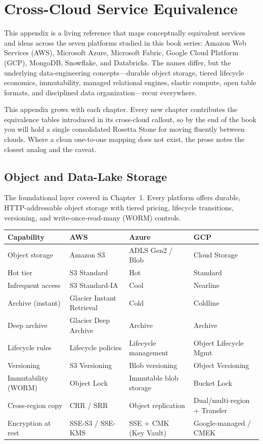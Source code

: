 \chapter{Cross-Cloud Service Equivalence}
%
This appendix is a living reference that maps conceptually equivalent services and
ideas across the seven platforms studied in this book series: Amazon Web Services
(AWS), Microsoft Azure, Microsoft Fabric, Google Cloud Platform (GCP), MongoDB,
Snowflake, and Databricks. The names differ, but the underlying data-engineering
concepts---durable object storage, tiered lifecycle economics, immutability, managed
relational engines, elastic compute, open table formats, and disciplined data
organization---recur everywhere.

\begin{notebox}
This appendix grows with each chapter. Every new chapter contributes the equivalence
tables introduced in its cross-cloud callout, so by the end of the book you will hold
a single consolidated Rosetta Stone for moving fluently between clouds. Where a clean
one-to-one mapping does not exist, the prose notes the closest analog and the caveat.
\end{notebox}

\section{Object and Data-Lake Storage}
%
The foundational layer covered in Chapter~1. Every platform offers durable, HTTP-addressable
object storage with tiered pricing, lifecycle transitions, versioning, and write-once-read-many
(WORM) controls.

\begin{center}
\footnotesize
\begin{tabular}{@{}p{2.8cm}p{3.2cm}p{3.2cm}p{3.2cm}@{}}
\toprule
\textbf{Capability} & \textbf{AWS} & \textbf{Azure} & \textbf{GCP} \\
\midrule
Object storage & Amazon S3 & ADLS Gen2 / Blob & Cloud Storage \\
Hot tier & S3 Standard & Hot & Standard \\
Infrequent access & S3 Standard-IA & Cool & Nearline \\
Archive (instant) & Glacier Instant Retrieval & Cold & Coldline \\
Deep archive & Glacier Deep Archive & Archive & Archive \\
Lifecycle rules & Lifecycle policies & Lifecycle management & Object Lifecycle Mgmt \\
Versioning & S3 Versioning & Blob versioning & Object Versioning \\
Immutability (WORM) & Object Lock & Immutable blob storage & Bucket Lock \\
Cross-region copy & CRR / SRR & Object replication & Dual/multi-region + Transfer \\
Encryption at rest & SSE-S3 / SSE-KMS & SSE + CMK (Key Vault) & Google-managed / CMEK \\
\bottomrule
\end{tabular}
\end{center}

